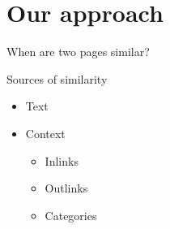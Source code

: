 \documentclass[xcolor=dvipsnames]{beamer}
\begin{document}
\section{Our approach}

\begin{frame}{When are two pages similar?}


\hspace{-2mm}\begin{minipage}{.28\textwidth}

\begin{block}{Sources of similarity}

\begin{itemize}
\item Text

\bigskip

\item Context
\begin{itemize}
\item Inlinks
\item Outlinks
\item Categories
\end{itemize}
\end{itemize}

\end{block}

\end{minipage}


\begin{minipage}{.8\textwidth}

\end{minipage}





\end{frame}







\end{document}
